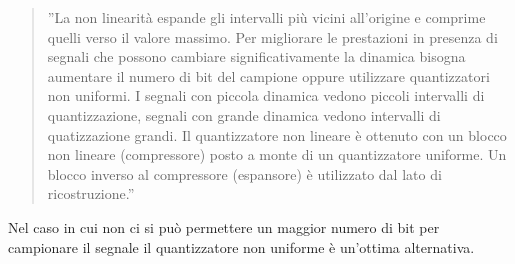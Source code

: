 \documentclass[a4paper]{report} %
\begin{document}
\begin{quote}
	''La non linearità espande gli intervalli più vicini all'origine e comprime quelli verso il valore massimo. 
	Per migliorare le prestazioni in presenza di segnali che possono cambiare significativamente la dinamica bisogna aumentare il numero di bit del campione oppure utilizzare quantizzatori non uniformi. I segnali con piccola dinamica vedono piccoli intervalli di quantizzazione, segnali con grande dinamica vedono intervalli di quatizzazione grandi. Il quantizzatore non lineare è ottenuto con un blocco non lineare (compressore) posto a monte di un quantizzatore uniforme. Un blocco inverso al compressore (espansore) è utilizzato dal lato di ricostruzione.'' 
\end{quote}
Nel caso in cui non ci si può permettere un maggior numero di bit per campionare il segnale il quantizzatore non uniforme è un'ottima alternativa.


\end{document}
